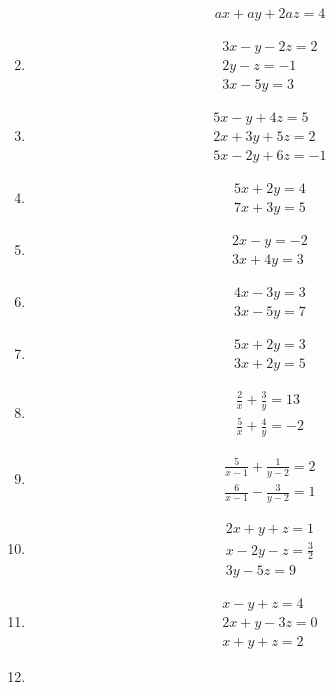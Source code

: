 \begin{enumerate}[label=\thesubsection.\arabic*,ref=\thesubsection.\theenumi]
\begin{align}
 ax+ay+2az = 4
\end{align}
\item
\begin{align}
 3x-y-2z = 2\\
 2y-z = -1\\
 3x-5y = 3
\end{align}
\item 
\begin{align}
 5x-y+4z = 5\\
 2x+3y+5z = 2\\
 5x-2y+6z = -1
\end{align}
\item   
\begin{align}
5x+2y = 4\\
7x+3y = 5
\end{align}
\item 
\begin{align}
 2x-y = -2\\
 3x+4y = 3
\end{align}
\item
\begin{align}
 4x-3y = 3\\
 3x-5y = 7
\end{align}
\item
\begin{align} 
 5x+2y = 3\\
 3x+2y = 5
\end{align}
\item 
\begin{align}
\frac{2}{x}+\frac{3}{y}= 13 \\ \frac{5}{x}+\frac{4}{y} = -2
\end{align}
\item 
\begin{align}
\frac{5}{x-1}+\frac{1}{y-2}= 2 \\ \frac{6}{x-1}-\frac{3}{y-2}= 1
\end{align}
\item
\begin{align}
 2x+y+z = 1\\
 x-2y-z = \frac{3}{2} \\
 3y-5z = 9
\end{align}
\item
\begin{align}
 x-y+z = 4\\
 2x+y-3z = 0\\
 x+y+z = 2
\end{align}
\item
\begin{align}

\end{align}
\end{enumerate}
